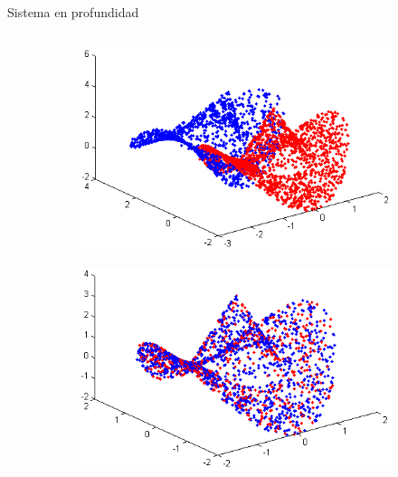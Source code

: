 \documentclass[]{beamer}
\begin{document}
\begin{frame}[fragile]{Sistema en profundidad}
\begin{columns}
\begin{column}{5cm}
{                \vspace{-10pt}
                \begin{figure}[t]
                    \centering
                    \begin{subfigure}[b]{0.7\textwidth}
                        \includegraphics[width=\textwidth]{img/alineacion/icp_ini.png}
                    \end{subfigure}
                    \quad
                    \begin{subfigure}[b]{0.7\textwidth}
                        \includegraphics[width=\textwidth]{img/alineacion/icp_fin.png}
                    \end{subfigure}
                \end{figure}
            }
\end{column}
\end{columns}
\end{frame}
\end{document}
